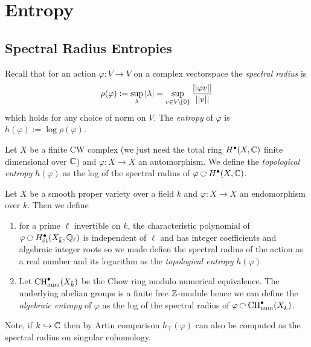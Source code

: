 \documentclass[12pt]{article}
\begin{document}
\section{Entropy}

\subsection{Spectral Radius Entropies}


Recall that for an action $\varphi : V \to V$ on a complex vectorspace the \textit{spectral radius} is 
\[ \rho(\varphi) := \sup_{\lambda} |\lambda| = \sup_{v \in V \! \setminus \! \{ 0 \}} \frac{|| \varphi v||}{|| v ||} \]
which holds for any choice of norm on $V$. The \textit{entropy} of $\varphi$ is $h(\varphi) := \log{\rho(\varphi)}$.

\begin{defn}
Let $X$ be a finite CW complex (we just need the total ring $H^\bullet(X, \mathbb{C})$ finite dimensional over $\mathbb{C}$) and $\varphi : X \to X$ an automorphism. We define the \textit{topological entropy} $h(\varphi)$ as the log of the spectral radius of $\varphi \acts H^\bullet(X, \CC)$. 
\end{defn}

\begin{defn}
Let $X$ be a smooth proper variety over a field $k$ and $\varphi : X \to X$ an endomorphism over $k$. Then we define
\begin{enumerate}
\item for a prime $\ell$ invertible on $k$, the characteristic polynomial of $\varphi \acts H^\bullet_{\et}(X_{\bar{k}}, \Q_{\ell})$ is independent of $\ell$ and has integer coefficients and algebraic integer roots so we made defien the spectral radius of the action as a real number and its logarithm as the \textit{topological entropy} $h(\varphi)$ 

\item Let $\mathrm{CH}^\bullet_{\text{num}}(X_{\bar{k}})$ be the Chow ring modulo numerical equivalence. The underlying abelian groups is a finite free $\mathbb{Z}$-module hence we can define the \textit{algebraic entropy} of $\varphi$ as the log of the spectral radius of $\varphi \acts \CH^\bullet_{\text{num}}(X_{\bar{k}})$.
\end{enumerate}
\end{defn}

\begin{rmk}
Note, if $k \hookrightarrow \mathbb{C}$ then by Artin comparison $h_{\top}(\varphi)$ can also be computed as the spectral radius on singular cohomology. 
\end{rmk}
\end{document}
